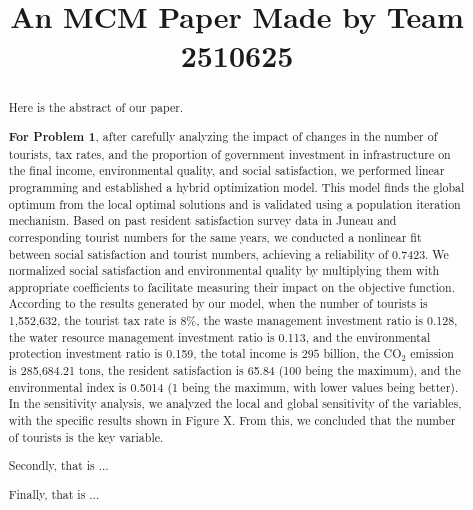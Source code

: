 \documentclass[12pt]{article}  %
\title{An MCM Paper Made by Team 2510625}  %
\begin{document}
\begin{abstract}
    Here is the abstract of our paper.
    
    \textbf{For Problem 1}, after carefully analyzing the impact of changes in the number of tourists, tax rates, and the proportion of government investment in infrastructure on the final income, environmental quality, and social satisfaction, we performed linear programming and established a hybrid optimization model. This model finds the global optimum from the local optimal solutions and is validated using a population iteration mechanism. Based on past resident satisfaction survey data in Juneau and corresponding tourist numbers for the same years, we conducted a nonlinear fit between social satisfaction and tourist numbers, achieving a reliability of 0.7423. 
    We normalized social satisfaction and environmental quality by multiplying them with appropriate coefficients to facilitate measuring their impact on the objective function. According to the results generated by our model, when the number of tourists is 1,552,632, the tourist tax rate is 8\%, the waste management investment ratio is 0.128, the water resource management investment ratio is 0.113, and the environmental protection investment ratio is 0.159, the total income is $295$ billion, the CO\(_2\) emission is 285,684.21 tons, the resident satisfaction is 65.84 (100 being the maximum), and the environmental index is 0.5014 (1 being the maximum, with lower values being better).
    In the sensitivity analysis, we analyzed the local and global sensitivity of the variables, with the specific results shown in Figure X. From this, we concluded that the number of tourists is the key variable.


    Secondly, that is ...

    Finally, that is ...


\end{abstract}
\end{document}
